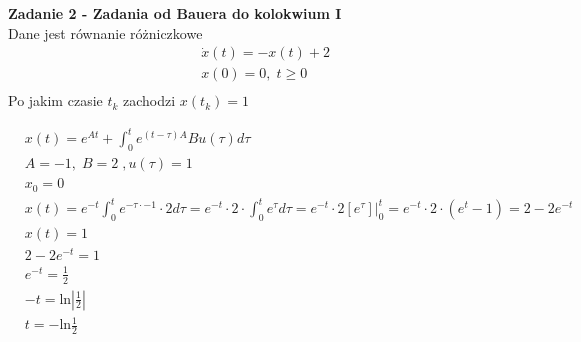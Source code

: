 \documentclass[a4paper,11pt]{article}
\begin{document}
\newpage
\begin{framed}
\textbf{Zadanie 2 - Zadania od Bauera do kolokwium I } \\ 
Dane jest równanie różniczkowe 
\begin{align*}
&\dot{x}(t)=-x(t)+2 \\
&x(0)=0, \; t \geq 0 \\ 
\end{align*}
Po jakim czasie \( t_k \) zachodzi \( x(t_k) = 1 \)
\end{framed}
\begin{align*}
&x(t)=e^{At}+\int _0^t e^{(t-\tau)A}Bu(\tau) d\tau \\
&A = -1, \; B = 2 \;, u(\tau)=1 \\
&x_0 = 0 \\
&x(t)=e^{-t} \int _0^t e^{-\tau \cdot -1} \cdot 2 d \tau = e^{-t} \cdot 2 \cdot \int _0^t e^{\tau} d\tau = e^{-t} \cdot 2 [ e^{\tau} ] \bigg | _0^t = e^{-t}\cdot 2 \cdot ( e^t - 1 ) = 2-2e^{-t} \\
&x(t) = 1 \\
&2-2e^{-t}=1 \\
&e^{-t}=\frac{1}{2} \\
&-t = \text{ln} |\frac{1}{2}| \\
&t = -\text{ln}\frac{1}{2}
\end{align*}
\end{document}

